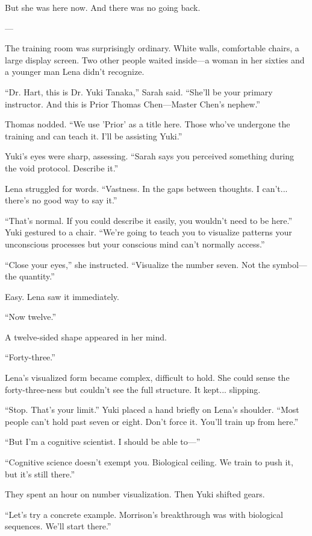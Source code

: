 But she was here now. And there was no going back.

---

The training room was surprisingly ordinary. White walls, comfortable chairs, a large display screen. Two other people waited inside—a woman in her sixties and a younger man Lena didn't recognize.

``Dr. Hart, this is Dr. Yuki Tanaka,'' Sarah said. ``She'll be your primary instructor. And this is Prior Thomas Chen—Master Chen's nephew.''

Thomas nodded. ``We use 'Prior' as a title here. Those who've undergone the training and can teach it. I'll be assisting Yuki.''

Yuki's eyes were sharp, assessing. ``Sarah says you perceived something during the void protocol. Describe it.''

Lena struggled for words. ``Vastness. In the gaps between thoughts. I can't... there's no good way to say it.''

``That's normal. If you could describe it easily, you wouldn't need to be here.'' Yuki gestured to a chair. ``We're going to teach you to visualize patterns your unconscious processes but your conscious mind can't normally access.''

``Close your eyes,'' she instructed. ``Visualize the number seven. Not the symbol—the quantity.''

Easy. Lena saw it immediately.

``Now twelve.''

A twelve-sided shape appeared in her mind.

``Forty-three.''

Lena's visualized form became complex, difficult to hold. She could sense the forty-three-ness but couldn't see the full structure. It kept... slipping.

``Stop. That's your limit.'' Yuki placed a hand briefly on Lena's shoulder. ``Most people can't hold past seven or eight. Don't force it. You'll train up from here.''

``But I'm a cognitive scientist. I should be able to—''

``Cognitive science doesn't exempt you. Biological ceiling. We train to push it, but it's still there.''

They spent an hour on number visualization. Then Yuki shifted gears.

``Let's try a concrete example. Morrison's breakthrough was with biological sequences. We'll start there.''

